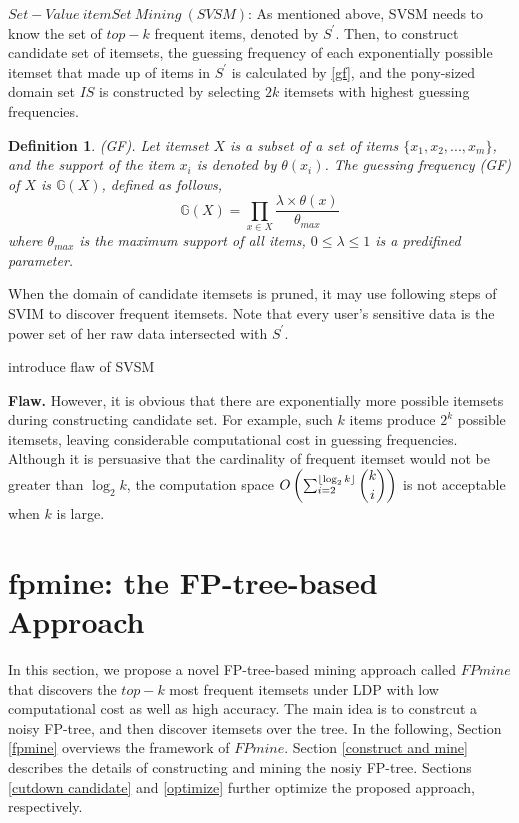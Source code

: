 \documentclass[conference]{IEEEtran}
\newtheorem{Definition}{\bf Definition}
\begin{document}

$Set-Value\ itemSet\ Mining\ (SVSM)$: As mentioned above, SVSM needs to know the set of $top-k$ frequent items, denoted by $S^{\prime}$. Then, to construct candidate set of itemsets, the guessing frequency of each  exponentially possible itemset that made up of items in $S^{\prime}$ is calculated by \eqref{gf}, and the pony-sized domain set $IS$ is constructed by selecting $2k$ itemsets with highest guessing frequencies.

\begin{Definition}
(GF). Let itemset $X$ is a subset of a set of items $\{{x_1,x_2,...,x_m} \}$, and the support of the item $x_i$ is denoted by $\theta(x_i)$. The guessing frequency (GF) of $X$ is $\mathbb{G}(X)$, defined as follows,\\
\begin{equation}
\mathbb{G}(X) = \prod_{x \in X} \frac{\lambda \times \theta(x)}{\theta_{max}} \label{gf}
\end{equation}
where $\theta_{max}$ is the maximum support of all items, $0 \leq \lambda \leq 1$ is a predifined parameter.

\end{Definition}

When the domain of candidate itemsets is pruned, it may use following steps of SVIM to discover frequent itemsets. Note that every user's sensitive data is the power set of her raw data intersected with $S^{\prime}$.

{\color{red}introduce flaw of SVSM}

\textbf{Flaw.} However, it is obvious that there are exponentially more possible itemsets during constructing candidate set. For example, such $k$ items produce $2^{k}$ possible itemsets, leaving considerable computational cost in guessing frequencies. Although it is persuasive that the cardinality of frequent itemset would not be greater than $\log_{2} k$, the computation space $O\left(\sum_{i=2}^{\lfloor \log_{2}k \rfloor} \dbinom{k}{i} \right)$ is not acceptable when $k$ is large.

\section{fpmine: the FP-tree-based Approach}
In this section, we propose a novel FP-tree-based mining approach called $FPmine$ that discovers the $top-k$ most frequent itemsets under LDP with low computational cost as well as high accuracy. The main idea is to constrcut a noisy FP-tree, and then discover itemsets over the tree. In the following, Section \ref{fpmine} overviews the framework of $FPmine$. Section \ref{construct and mine} describes the details of constructing and mining the nosiy FP-tree. Sections \ref{cutdown candidate} and \ref{optimize} further optimize the proposed approach, respectively.
\end{document}

